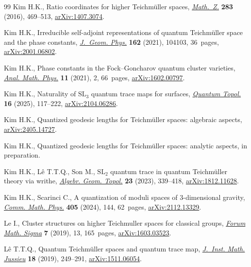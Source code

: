 \documentclass[10pt,a4paper]{amsart}
\numberwithin{equation}{section}
\theoremstyle{definition}
\begin{document}
\begin{thebibliography}{99}
Kim H.K., Ratio coordinates for higher {T}eichm\"{u}ller spaces,
 \href{https://doi.org/10.1007/s00209-015-1607-4}{\textit{Math.~Z.}}
 \textbf{283} (2016), 469--513,
 \href{http://arxiv.org/abs/1407.3074}{arXiv:1407.3074}.

Kim H.K., Irreducible self-adjoint representations of quantum {T}eichm\"{u}ller
 space and the phase constants,
 \href{https://doi.org/10.1016/j.geomphys.2021.104103}{\textit{J.~Geom.
 Phys.}} \textbf{162} (2021), 104103, 36~pages,
 \href{http://arxiv.org/abs/2001.06802}{arXiv:2001.06802}.

Kim H.K., Phase constants in the {F}ock--{G}oncharov quantum cluster varieties,
 \href{https://doi.org/10.1007/s13324-020-00439-3}{\textit{Anal. Math. Phys.}}
 \textbf{11} (2021), 2, 66~pages,
 \href{http://arxiv.org/abs/1602.00797}{arXiv:1602.00797}.

Kim H.K., Naturality of {$\mathrm{SL}_3$} quantum trace maps for surfaces,
 \href{https://doi.org/10.4171/qt/214}{\textit{Quantum Topol.}} \textbf{16}
 (2025), 117--222, \href{http://arxiv.org/abs/2104.06286}{arXiv:2104.06286}.

Kim H.K., Quantized geodesic lengths for {T}eichm\"{u}ller spaces: algebraic
 aspects, \href{http://arxiv.org/abs/2405.14727}{arXiv:2405.14727}.

Kim H.K., Quantized geodesic lengths for {T}eichm\"uller spaces: analytic
 aspects, {i}n preparation.

Kim H.K., L\^{e} T.T.Q., Son M., {$\mathrm{SL}_2$} quantum trace in quantum
 {T}eichm\"{u}ller theory via writhe,
 \href{https://doi.org/10.2140/agt.2023.23.339}{\textit{Algebr. Geom. Topol.}}
 \textbf{23} (2023), 339--418,
 \href{http://arxiv.org/abs/1812.11628}{arXiv:1812.11628}.

Kim H.K., Scarinci C., A quantization of moduli spaces of $3$-dimensional
 gravity, \href{https://doi.org/10.1007/s00220-024-05012-8}{\textit{Comm.
 Math. Phys.}} \textbf{405} (2024), 144, 62~pages,
 \href{http://arxiv.org/abs/2112.13329}{arXiv:2112.13329}.

Le I., Cluster structures on higher {T}eichmuller spaces for classical groups,
 \href{https://doi.org/10.1017/fms.2019.5}{\textit{Forum Math. Sigma}}
 \textbf{7} (2019), 13, 165~pages,
 \href{http://arxiv.org/abs/1603.03523}{arXiv:1603.03523}.

L\^{e} T.T.Q., Quantum {T}eichm\"{u}ller spaces and quantum trace map,
 \href{https://doi.org/10.1017/s1474748017000068}{\textit{J.~Inst. Math.
 Jussieu}} \textbf{18} (2019), 249--291,
 \href{http://arxiv.org/abs/1511.06054}{arXiv:1511.06054}.


\end{thebibliography}
\end{document}
